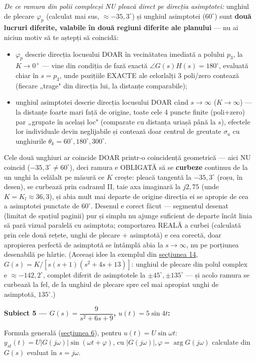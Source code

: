 \documentclass[10pt,a4paper]{article}
\newcommand{\tip}[1]{\textcolor{blue!55!black}{#1}}
\begin{document}
\tip{\textit{De ce ramura din polii complecși NU pleacă direct pe direcția asimptotei:} unghiul de plecare $\varphi_p$ (calculat mai sus, $\approx{-}35{,}3^\circ$) și unghiul asimptotei ($60^\circ$) sunt \textbf{două lucruri diferite, valabile în două regiuni diferite ale planului} — nu ai niciun motiv să te aștepți să coincidă:
\begin{itemize}
\item $\varphi_p$ descrie direcția locusului DOAR în vecinătatea imediată a polului $p_3$, la $K{\to}0^+$ — vine din condiția de fază exactă $\angle G(s)H(s){=}180^\circ$, evaluată chiar în $s{=}p_3$, unde pozițiile EXACTE ale celorlalți 3 poli/zero contează (fiecare „trage" din direcția lui, la distanțe comparabile);
\item unghiul asimptotei descrie direcția locusului DOAR când $s\to\infty$ ($K\to\infty$) — la distanțe foarte mari față de origine, toate cele 4 puncte finite (poli+zero) par „grupate în același loc" (comparate cu distanța uriașă până la $s$), efectele lor individuale devin neglijabile și contează doar centrul de greutate $\sigma_a$ cu unghiurile $\theta_k{=}60^\circ,180^\circ,300^\circ$.
\end{itemize}
Cele două unghiuri ar coincide DOAR printr-o coincidență geometrică — aici NU coincid ($-35{,}3^\circ\ne60^\circ$), deci ramura e OBLIGATĂ să se \textbf{curbeze} continuu de la un unghi la celălalt pe măsură ce $K$ crește: pleacă tangentă la $-35{,}3^\circ$ (roșu, în desen), se curbează prin cadranul II, taie axa imaginară la $j2{,}75$ (unde $K{=}K_l{\approx}36{,}3$), și abia mult mai departe de origine direcția ei se apropie de cea a asimptotei punctate de $60^\circ$. Desenul e corect făcut — segmentul desenat (limitat de spațiul paginii) pur și simplu nu ajunge suficient de departe încât linia să pară vizual paralelă cu asimptota; comportarea REALĂ a curbei (calculată prin cele două rețete, unghi de plecare + asimptotă) e cea corectă, doar apropierea perfectă de asimptotă se întâmplă abia la $s\to\infty$, nu pe porțiunea desenabilă pe hârtie. (Aceeași idee la exemplul din \hyperref[sec:14]{secțiunea 14}, $G(s){=}K/[s(s{+}1)(s^2{+}4s{+}13)]$: unghiul de plecare din polul complex e $\approx{-}142{,}2^\circ$, complet diferit de asimptotele la $\pm45^\circ,\pm135^\circ$ — și acolo ramura se curbează la fel, de la unghiul de plecare spre cel mai apropiat unghi de asimptotă, $135^\circ$.)}

\textbf{Subiect 5 — $G(s)=\dfrac9{s^2+6s+9}$, $u(t)=5\sin4t$:}

Formula generală (\hyperref[sec:6]{secțiunea 6}), pentru $u(t)=U\sin\omega t$: $y_{st}(t)=U|G(j\omega)|\sin(\omega t+\varphi)$, cu $|G(j\omega)|,\varphi=\arg G(j\omega)$ calculate din $G(s)$ evaluat în $s{=}j\omega$.
\end{document}
